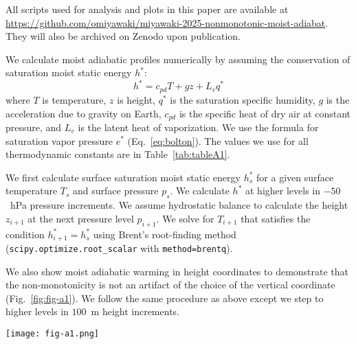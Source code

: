 \documentclass[]{ametsocV6.1}
\begin{document}
% 
%
\datastatement
All scripts used for analysis and plots in this paper are available at \url{https://github.com/omiyawaki/miyawaki-2025-nonmonotonic-moist-adiabat}. They will also be archived on Zenodo upon publication.



\appendix[A] 
\label{app:calculation}
We calculate moist adiabatic profiles numerically by assuming the conservation of saturation moist static energy $h^*$:
\begin{equation}
h^*=c_{pd} T+gz+L_v q^* \label{eq:mse}
\end{equation}
where $T$ is temperature, $z$ is height, $q^*$ is the saturation specific humidity, $g$ is the acceleration due to gravity on Earth, $c_{pd}$ is the specific heat of dry air at constant pressure, and $L_v$ is the latent heat of vaporization. We use the \cite{bolton1980} formula for saturation vapor pressure $e^*$ (Eq.~\ref{eq:bolton}). The values we use for all thermodynamic constants are in Table~\ref{tab:tableA1}. 

We first calculate surface saturation moist static energy $h_s^*$ for a given surface temperature $T_s$ and surface pressure $p_s$. We calculate $h^*$ at higher levels in $-50$~hPa pressure increments. We assume hydrostatic balance to calculate the height $z_{i+1}$ at the next pressure level $p_{i+1}$. We solve for $T_{i+1}$ that satisfies the condition $h_{i+1}^*=h_s^*$ using Brent's root-finding method (\texttt{scipy.optimize.root\_scalar} with \texttt{method=brentq}).

We also show moist adiabatic warming in height coordinates to demonstrate that the non-monotonicity is not an artifact of the choice of the vertical coordinate (Fig.~\ref{fig:fig-a1}). We follow the same procedure as above except we step to higher levels in $100$~m height increments.

\begin{figure*}[htbp]
 \centering
 \texttt{[image: fig-a1.png]}
 \caption{(a) Vertical profiles of moist adiabatic warming to a 4~K surface warming for $T_s=$ 280, 290, 300, 310, and 320~K. Warming decreases with initial surface temperature at lower levels while it increases with initial surface temperature at higher levels. (b) Moist adiabatic warming varies non-monotonically with initial surface temperature at all levels, e.g. at 5~km, 10~km, 15~km, and 20~km. Moist adiabatic warming peaks at warmer initial surface temperatures at higher levels.}\label{fig:fig-a1}
\end{figure*}
\end{document}
